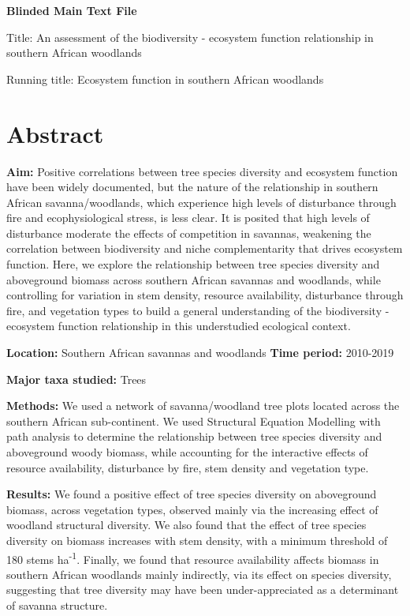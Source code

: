 \documentclass[11pt,a4paper]{article}
\newcommand{\textapprox}{\raisebox{0.5ex}{\texttildelow}}  %
\begin{document}
\newpage{}

{\LARGE{\textbf{Blinded Main Text File}}}

\LARGE{Title: An assessment of the biodiversity - ecosystem function relationship in southern African woodlands}

\normalsize{Running title: Ecosystem function in southern African woodlands}

\section{Abstract}

\textbf{Aim:} Positive correlations between tree species diversity and ecosystem function have been widely documented, but the nature of the relationship in southern African savanna/woodlands, which experience high levels of disturbance through fire and ecophysiological stress, is less clear. It is posited that high levels of disturbance moderate the effects of competition in savannas, weakening the correlation between biodiversity and niche complementarity that drives ecosystem function. Here, we explore the relationship between tree species diversity and aboveground biomass across southern African savannas and woodlands, while controlling for variation in stem density, resource availability, disturbance through fire, and vegetation types to build a general understanding of the biodiversity - ecosystem function relationship in this understudied ecological context.

\textbf{Location:} Southern African savannas and woodlands
\textbf{Time period:} 2010-2019

\textbf{Major taxa studied:} Trees

\textbf{Methods:} We used a network of \nplots{} savanna/woodland tree plots located across the southern African sub-continent. We used Structural Equation Modelling with path analysis to determine the relationship between tree species diversity and aboveground woody biomass, while accounting for the interactive effects of resource availability, disturbance by fire, stem density and vegetation type.

\textbf{Results:} We found a positive effect of tree species diversity on aboveground biomass, across vegetation types, observed mainly via the increasing effect of woodland structural diversity. We also found that the effect of tree species diversity on biomass increases with stem density, with a minimum threshold of \textapprox{}180 stems ha\textsuperscript{-1}. Finally, we found that resource availability affects biomass in southern African woodlands mainly indirectly, via its effect on species diversity, suggesting that tree diversity may have been under-appreciated as a determinant of savanna structure.
\end{document}
